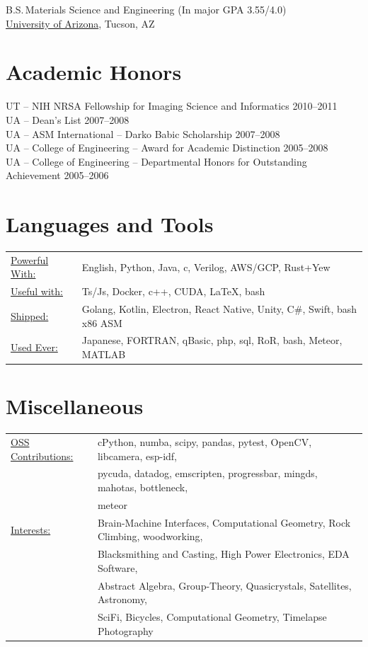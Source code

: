 \documentclass{res}
\begin{document}
\begin{resume}
  B.S.\,Materials Science and Engineering (In major GPA 3.55/4.0) \\
  \href{https://mse.engineering.arizona.edu/}{University of Arizona}, Tucson, AZ

\section{Academic Honors}
UT -- NIH NRSA Fellowship for Imaging Science and Informatics \hfill 2010--2011 \\
UA -- Dean’s List \hfill 2007--2008 \\
UA -- ASM International -- Darko Babic Scholarship \hfill 2007--2008 \\
UA -- College of Engineering -- Award for Academic Distinction \hfill 2005--2008 \\
UA -- College of Engineering -- Departmental Honors for Outstanding Achievement \hfill 2005--2006

\section{Languages and Tools}
 \begin{tabular}{l p{5.5in}}
   \underline{Powerful With:} & English, Python, Java, c, Verilog, AWS/GCP,  Rust+Yew \\
   \underline{Useful with:}   & Ts/Js, Docker, c++, CUDA, \LaTeX, bash \\
   \underline{Shipped:}       & Golang, Kotlin, Electron, React Native, Unity, C\#, Swift, bash x86 ASM \\
   \underline{Used Ever:}     & Japanese, FORTRAN, qBasic, php, sql, RoR, bash, Meteor, MATLAB \\
 \end{tabular}

\section{Miscellaneous}
  \begin{tabular}{l p{5.5in}}
    \underline{OSS Contributions:} & cPython, numba, scipy, pandas, pytest, OpenCV, libcamera, esp-idf, \\
                                   & pycuda, datadog, emscripten, progressbar, mingds, mahotas, bottleneck, \\
                                   & meteor  \\
    \underline{Interests:}         & Brain-Machine Interfaces, Computational Geometry, Rock Climbing, woodworking,\\
                                   & Blacksmithing and Casting, High Power Electronics, EDA Software, \\
                                   & Abstract Algebra, Group-Theory, Quasicrystals, Satellites, Astronomy, \\
                                   & SciFi, Bicycles, Computational Geometry, Timelapse Photography
 \end{tabular}

\end{resume}
\end{document}
